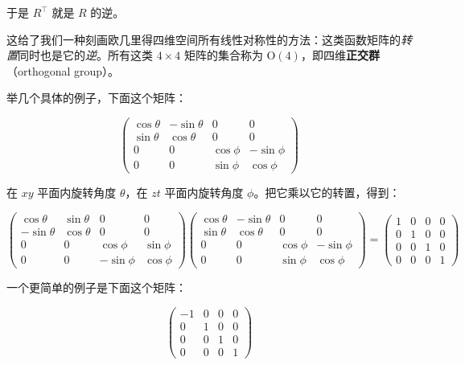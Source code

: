 于是 $R^{\!\top}$ 就是 $R$ 的逆。

这给了我们一种刻画欧几里得四维空间所有线性对称性的方法：这类函数矩阵的\emph{转置}同时也是它的\emph{逆}。所有这类 $4\times4$ 矩阵的集合称为 $\mathrm{O}(4)$，即四维\textbf{正交群}（orthogonal group）。

举几个具体的例子，下面这个矩阵：

\begin{equation}
\begin{pmatrix}
\cos\theta & -\sin\theta & 0 & 0\\
\sin\theta & \cos\theta & 0 & 0\\
0 & 0 & \cos\phi & -\sin\phi\\
0 & 0 & \sin\phi & \cos\phi
\end{pmatrix}
\end{equation}

在 $xy$ 平面内旋转角度 $\theta$，在 $zt$ 平面内旋转角度 $\phi$。把它乘以它的转置，得到：

\begin{equation}
\begin{pmatrix}
\cos\theta & \sin\theta & 0 & 0\\
-\sin\theta & \cos\theta & 0 & 0\\
0 & 0 & \cos\phi & \sin\phi\\
0 & 0 & -\sin\phi & \cos\phi
\end{pmatrix}
\begin{pmatrix}
\cos\theta & -\sin\theta & 0 & 0\\
\sin\theta & \cos\theta & 0 & 0\\
0 & 0 & \cos\phi & -\sin\phi\\
0 & 0 & \sin\phi & \cos\phi
\end{pmatrix}
=
\begin{pmatrix}
1 & 0 & 0 & 0\\
0 & 1 & 0 & 0\\
0 & 0 & 1 & 0\\
0 & 0 & 0 & 1
\end{pmatrix}
\end{equation}

一个更简单的例子是下面这个矩阵：

\begin{equation}
\begin{pmatrix}
-1 & 0 & 0 & 0\\
0 & 1 & 0 & 0\\
0 & 0 & 1 & 0\\
0 & 0 & 0 & 1
\end{pmatrix}
\end{equation}

